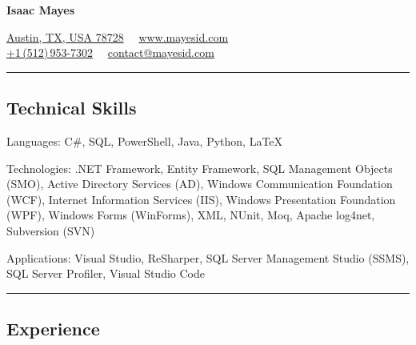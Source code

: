 \documentclass[9pt,letterpaper]{extarticle}
\newenvironment{indentsection}[1]%
{\begin{list}{}%
	{\setlength{\leftmargin}{#1}}%
	\item[]%
}
{\end{list}}
\begin{document}
\begin{center}
{\Huge \textbf{Isaac Mayes}}

\href{https://www.google.com/maps/place/Austin,+TX+78728/}{Austin, TX, USA 78728}\ \textbullet
\ \href{http://www.mayesid.com}{www.mayesid.com}
\\
\href{tel:+15129537302}{+1\,(512)\,953-7302}\ \textbullet
\ \href{mailto:contact@mayesid.com}{contact@mayesid.com}
\end{center}

\hrule
\vspace{-0.2em}
\subsection*{Technical Skills}

\begin{indentsection}{\parindent}
\begin{description*}
	\item[Languages:]
	C\#, SQL, PowerShell, Java, Python, \LaTeX
	\item[Technologies:]
	.NET Framework, Entity Framework, SQL Management Objects (SMO), Active Directory Services (AD), Windows Communication Foundation (WCF), Internet Information Services (IIS), Windows Presentation Foundation (WPF), Windows Forms (WinForms), XML, NUnit, Moq, Apache log4net, Subversion (SVN)
	\item[Applications:]
	Visual Studio, ReSharper, SQL Server Management Studio (SSMS), SQL Server Profiler, Visual Studio Code
\end{description*}
\end{indentsection}

\hrule
\vspace{-0.2em}
\subsection*{Experience}
\end{document}
